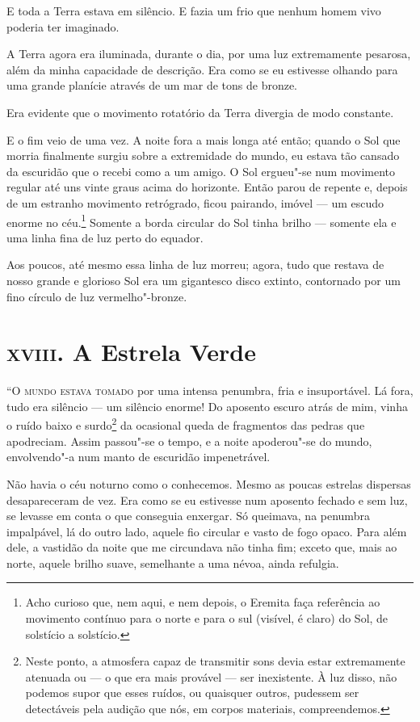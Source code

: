 E toda a Terra estava em silêncio. E fazia um frio que nenhum homem vivo poderia ter imaginado.

A Terra agora era iluminada, durante o dia, por uma luz extremamente pesarosa, além da minha capacidade de descrição. Era
como se eu estivesse olhando para uma grande planície através de um mar de tons de bronze.

Era evidente que o movimento rotatório da Terra divergia de modo constante.

E o fim veio de uma vez. A noite fora a mais longa até então; quando o Sol que morria finalmente surgiu sobre a
extremidade do mundo, eu estava tão cansado da escuridão que o recebi como a um amigo. O Sol ergueu"-se num movimento
regular até uns vinte graus acima do horizonte. Então parou de repente e, depois de um estranho movimento retrógrado,
ficou pairando, imóvel --- um escudo enorme no céu.\footnote{ Acho curioso que,
nem aqui, e nem depois, o Eremita faça referência ao movimento contínuo para o
norte e para o sul (visível, é claro) do Sol, de solstício a solstício.} 
Somente a borda circular do Sol tinha brilho --- somente ela e uma
linha fina de luz perto do equador.

Aos poucos, até mesmo essa linha de luz morreu; agora, tudo que restava de nosso grande e glorioso Sol era um
gigantesco disco extinto, contornado por um fino círculo de luz vermelho"-bronze.


\clearpage

\chapter{\textsc{xviii}. A Estrela Verde}

\textsc{“O mundo estava tomado} por uma intensa penumbra, fria e insuportável. Lá fora, tudo era silêncio --- um silêncio
enorme! Do aposento escuro atrás de mim, vinha o ruído baixo e surdo\footnote{ Neste ponto, a atmosfera capaz de transmitir 
sons devia estar extremamente atenuada ou --- o que era mais provável ---
ser inexistente. À luz disso, não podemos supor que esses ruídos, ou quaisquer outros, pudessem ser detectáveis pela
audição que nós, em corpos materiais, compreendemos.} da ocasional queda de fragmentos das pedras
que apodreciam. Assim passou"-se o tempo, e a noite apoderou"-se do mundo, envolvendo"-a num manto de escuridão
impenetrável.

Não havia o céu noturno como o conhecemos. Mesmo as poucas estrelas dispersas desapareceram de vez. Era como se eu
estivesse num aposento fechado e sem luz, se levasse em conta o que conseguia enxergar. Só queimava, na penumbra
impalpável, lá do outro lado, aquele fio circular e vasto de fogo opaco. Para além dele, a vastidão da noite que me
circundava não tinha fim; exceto que, mais ao norte, aquele brilho suave, semelhante a uma névoa, ainda refulgia.

